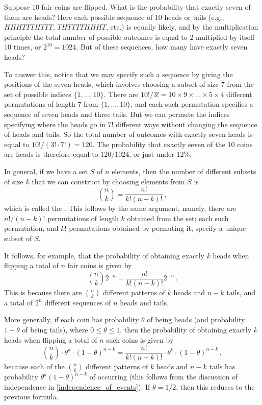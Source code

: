 \begin{example}
    Suppose 10 fair coins are flipped. What is the probability that exactly seven of them are heads? Here each possible sequence of 10 heads or tails (e.g., $HHHTTTHTTT$, $THTTTTHHHT$, etc.) is equally likely, and by the multiplication principle the total number of possible outcomes is equal to 2 multiplied by itself 10 times, or $2^{10}=1024$. But of these sequences, how many have exactly seven heads?

    To answer this, notice that we may specify such a sequence by giving the positions of the seven heads, which involves choosing a subset of size 7 from the set of possible indices $\{1,\dots,10\}$. There are $10!/3!=10\times9\times\dots\times5\times4$ different permutations of length 7 from $\{1,\dots,10\}$, and each such permutation specifies a sequence of seven heads and three tails. But we can permute the indices specifying where the heads go in $7!$ different ways without changing the sequence of heads and tails. So the total number of outcomes with exactly seven heads is equal to $10!/(3!\cdot7!)=120$. The probability that exactly seven of the 10 coins are heads is therefore equal to $120/1024$, or just under 12\%.

    In general, if we have a set $S$ of $n$ elements, then the number of different subsets of size $k$ that we can construct by choosing elements from $S$ is
    $$
    \binom n k = \frac{n!}{k!(n-k)!}\,,
    $$
    which is called the . This follows by the same argument, namely, there are $n!/(n-k)!$ permutations of length $k$ obtained from the set; each such permutation, and $k!$ permutations obtained by permuting it, specify a unique subset of $S$.
\end{example}

It follows, for example, that the probability of obtaining exactly $k$ heads when flipping a total of $n$  fair coins is  given by
$$
\binom{n}{k}2^{-n} = \frac{n!}{k!(n-k)!}2^{-n}\,.
$$
This is because there are $\binom n k$ different patterns of $k$ heads and $n-k$ tails, and a total of $2^n$ different sequences of $n$  heads and tails.

More generally, if each coin has probability $\theta$ of being heads (and probability $1-\theta$ of being tails), where $0 \leqslant \theta \leqslant 1$, then the probability of obtaining exactly $k$ heads when flipping a total of $n$ such coins is given by
\begin{equation}
    \binom{n}{k}\cdot\theta^k\cdot(1-\theta)^{n-k} = \frac{n!}{k!(n-k)!}\cdot\theta^k\cdot(1-\theta)^{n-k}\,,
\end{equation}
because each of the $\binom{n}{k}$ different patterns of $k$ heads and $n-k$ tails has probability $\theta^k(1-\theta)^{n-k}$ of occurring (this follows from the discussion of independence in \autoref{independence_of_events}). If $\theta=1/2$, then this reduces to the previous formula.

